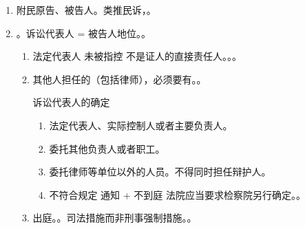 \begin{enumerate}
\begin{enumerate}
\begin{enumerate}
                  \item 辩护、拒绝回答、开庭前 10 日内收到起诉书副本。。
                  \item 法庭辩论、最后陈述权、反诉。
                \end{enumerate}
          \item {}。针对不合法（主观认为即可） \hz 侵权。申请对决定、裁决、判决变更 \hz 撤销。
                \begin{enumerate}
                  \item 申请复议、控告、变更强制措施。
                  \item 上诉。。
                  \item 申诉。\yi 仅酌定不起诉决定 \yjt 对检察院。\er 生效裁判 \yjt 对检察院、法院。
                  \item 缺席审判异议。
                \end{enumerate}
          \item 其他程序权利。
        \end{enumerate}
  \item 附民原告、被告人。类推民诉，。
  \item {}。诉讼代表人 = 被告人地位。。
        \begin{enumerate}
          \item 法定代表人 \yjt 未被指控 \hz 不是证人的直接责任人。。。
          \item 其他人担任的（包括律师），必须要有。。
                \begin{kk}{诉讼代表人的确定}
                  \begin{enumerate}
                    \item 法定代表人、实际控制人或者主要负责人。
                    \item 委托其他负责人或者职工。
                    \item 委托律师等单位以外的人员。不得同时担任辩护人。
                    \item 不符合规定 \hz 通知 + 不到庭 \yjt 法院应当要求检察院另行确定。。
                  \end{enumerate}
                \end{kk}
          \item 出庭。。司法措施而非刑事强制措施。。

\end{enumerate}
\end{enumerate}
